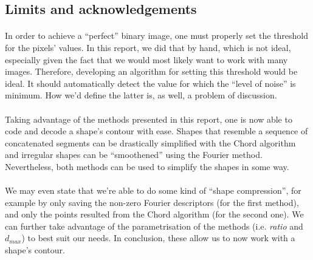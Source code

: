 \subsection{Limits and acknowledgements}
\paragraph{}
In order to achieve a ``perfect'' binary image, one must properly set the threshold for the pixels' values. In this report, we did that by hand, which is not ideal, especially given the fact that we would most likely want to work with many images. Therefore, developing an algorithm for setting this threshold would be ideal. It should automatically detect the value for which the ``level of noise'' is minimum. How we'd define the latter is, as well, a problem of discussion.

\paragraph{}
Taking advantage of the methods presented in this report, one is now able to code and decode a shape's contour with ease.
Shapes that resemble a sequence of concatenated segments can be drastically simplified with the Chord algorithm and irregular shapes can be ``smoothened'' using the Fourier method.
Nevertheless, both methods can be used to simplify the shapes in some way.
\paragraph{}
We may even state that we're able to do some kind of ``shape compression'', for example by only saving the non-zero Fourier descriptors (for the first method), and only the points resulted from the Chord algorithm (for the second one).
We can further take advantage of the parametrisation of the methods (i.e. \emph{ratio} and $d_{max}$) to best suit our needs.
In conclusion, these allow us to now work with a shape's contour.